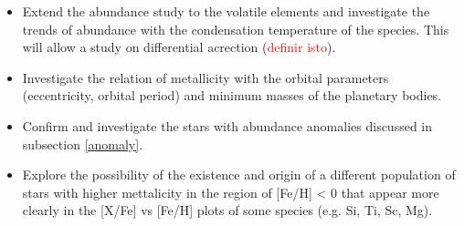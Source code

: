 \documentclass[dvips,12pt,a4paper]{report}
\begin{document}
{{\begin{itemize}
\item Extend the abundance study to the volatile elements and investigate the trends of abundance with the condensation temperature of the species. This will allow a study on differential acrection (\textcolor{red}{definir isto}).

\item Investigate the relation of metallicity with the orbital parameters (eccentricity, orbital period) and minimum masses of the planetary bodies.

\item Confirm and investigate the stars with abundance anomalies discussed in subsection \ref{anomaly}.

\item Explore the possibility of the existence and origin of a different population of stars with higher mettalicity in the region of [Fe/H] < 0 that appear more clearly in the [X/Fe] vs [Fe/H] plots of some species (e.g. Si, Ti, Sc, Mg).

\end{itemize}

 










}}
\end{document}
